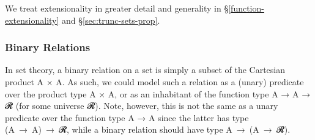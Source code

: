 \ccpad
We treat extensionality in greater detail and generality in \S\ref{function-extensionality} and \S\ref{sec:trunc-sets-prop}.









\subsubsection{Binary Relations}\label{sec:binary-relations}

In set theory, a binary relation on a set  is simply a subset of the Cartesian product \ab A × \ab A. As such, we could model such a relation as a (unary) predicate over the product type \ab A \af × \ab A, or as an inhabitant of the function type \ab A \as → \ab A \as → \ab 𝓡\af ̇ (for some universe \ab 𝓡).  Note, however, this is not the same as a unary predicate over the function type \ab A \as → \ab A since the latter has type  (\ab A~\as →~\ab A)~\as →~\ab 𝓡\af ̇, while a binary relation should have type \ab A~\as →~(\ab A~\as →~\ab 𝓡\af ̇). 

